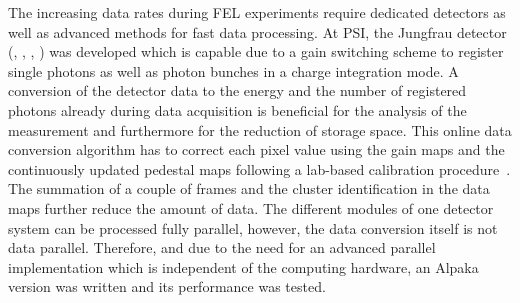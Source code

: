 \documentclass[a4paper]{article}
\begin{document}
The increasing data rates during FEL experiments require dedicated detectors as well as advanced methods for fast data processing.
At PSI, the Jungfrau detector (\cite{JFapplications}, \cite{JFcalibration}, \cite{JFoperation}, \cite{Mozzanica_2016}) was developed which is capable due to a gain switching scheme to register single photons as well as photon bunches in a charge integration mode. A conversion of the detector data to the energy and the number of registered photons already during data acquisition is beneficial for the analysis of the measurement and furthermore for the reduction of storage space. This online data conversion algorithm has to correct each pixel value using the gain maps and the continuously updated pedestal maps following a lab-based calibration  procedure~\cite{JFcalibration}. The summation of a couple of frames and the cluster identification in the data maps further reduce the amount of data. The different modules of one detector system can be processed fully parallel, however, the data conversion itself is not data parallel. Therefore, and due to the need for an advanced parallel implementation which is independent of the computing hardware, an Alpaka \cite{Matthes17} version was written and its performance was tested.\\
\end{document}
